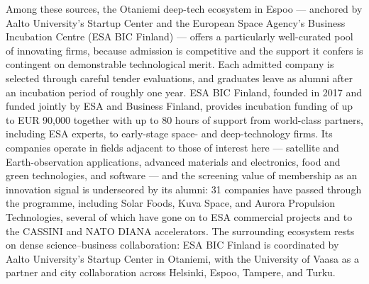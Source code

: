 \documentclass[runningheads]{llncs}
\begin{document}
Among these sources, the Otaniemi deep-tech ecosystem in Espoo — anchored by Aalto University's Startup Center and the European Space Agency's Business Incubation Centre (ESA BIC Finland) — offers a particularly well-curated pool of innovating firms, because admission is competitive and the support it confers is contingent on demonstrable technological merit. Each admitted company is selected through careful tender evaluations, and graduates leave as alumni after an incubation period of roughly one year. ESA BIC Finland, founded in 2017 and funded jointly by ESA and Business Finland, provides incubation funding of up to EUR 90,000 together with up to 80 hours of support from world-class partners, including ESA experts, to early-stage space- and deep-technology firms. Its companies operate in fields adjacent to those of interest here — satellite and Earth-observation applications, advanced materials and electronics, food and green technologies, and software — and the screening value of membership as an innovation signal is underscored by its alumni: 31 companies have passed through the programme, including Solar Foods, Kuva Space, and Aurora Propulsion Technologies, several of which have gone on to ESA commercial projects and to the CASSINI and NATO DIANA accelerators. The surrounding ecosystem rests on dense science–business collaboration: ESA BIC Finland is coordinated by Aalto University's Startup Center in Otaniemi, with the University of Vaasa as a partner and city collaboration across Helsinki, Espoo, Tampere, and Turku.
\end{document}
